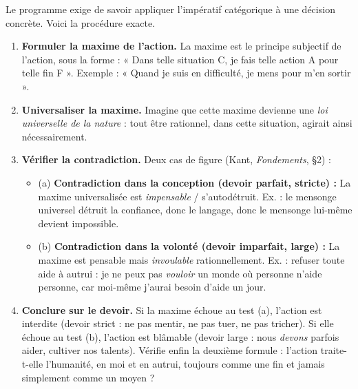 \documentclass[11pt]{article}
\begin{document}
\begin{methode}
Le programme exige de savoir appliquer l'impératif catégorique à une décision concrète. Voici la procédure exacte.
\begin{enumerate}
\item \textbf{Formuler la maxime de l'action.} La maxime est le principe subjectif de l'action, sous la forme : « Dans telle situation C, je fais telle action A pour telle fin F ». Exemple : « Quand je suis en difficulté, je mens pour m'en sortir ».
\item \textbf{Universaliser la maxime.} Imagine que cette maxime devienne une \emph{loi universelle de la nature} : tout être rationnel, dans cette situation, agirait ainsi nécessairement.
\item \textbf{Vérifier la contradiction.} Deux cas de figure (Kant, \emph{Fondements}, §2) :
\begin{itemize}
\item (a) \textbf{Contradiction dans la conception (devoir parfait, stricte) :} La maxime universalisée est \emph{impensable} / s'autodétruit. Ex. : le mensonge universel détruit la confiance, donc le langage, donc le mensonge lui-même devient impossible.
\item (b) \textbf{Contradiction dans la volonté (devoir imparfait, large) :} La maxime est pensable mais \emph{invoulable} rationnellement. Ex. : refuser toute aide à autrui : je ne peux pas \emph{vouloir} un monde où personne n'aide personne, car moi-même j'aurai besoin d'aide un jour.
\end{itemize}
\item \textbf{Conclure sur le devoir.} Si la maxime échoue au test (a), l'action est interdite (devoir strict : ne pas mentir, ne pas tuer, ne pas tricher). Si elle échoue au test (b), l'action est blâmable (devoir large : nous \emph{devons} parfois aider, cultiver nos talents). Vérifie enfin la deuxième formule : l'action traite-t-elle l'humanité, en moi et en autrui, toujours comme une fin et jamais simplement comme un moyen ?
\end{enumerate}
\end{methode}
\end{document}

